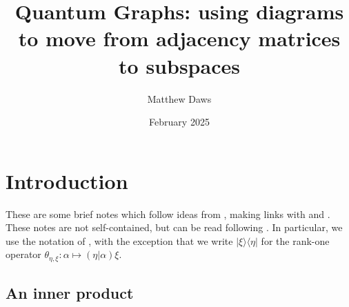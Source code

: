 \documentclass[a4paper,11pt]{article}
\theoremstyle{plain}
\theoremstyle{remark}
\begin{document}
\title{Quantum Graphs: using diagrams to move from adjacency matrices to subspaces}
\author{Matthew Daws}
\date{February 2025}
\maketitle

\section{Introduction}

These are some brief notes which follow ideas from \cite{Yamashita_QG_Notes}, making links with \cite[Section~5.4]{daws_quantum_graphs} and \cite{Wasilewski_Quantum_Cayley}.  These notes are not self-contained, but can be read following \cite{daws_quantum_graphs}.  In particular, we use the notation of \cite[Section~5.1]{daws_quantum_graphs}, with the exception that we write $|\xi\rangle\langle\eta|$ for the rank-one operator $\theta_{\eta,\xi} \colon \alpha \mapsto (\eta|\alpha) \xi$.


\subsection{An inner product}\label{sec:ip}
\end{document}
